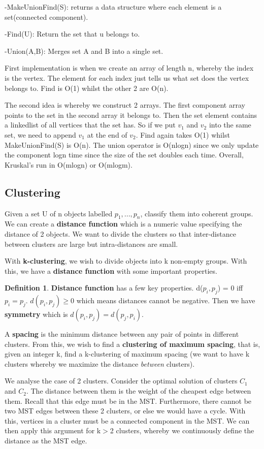 \documentclass[11pt, oneside]{article}
\theoremstyle{definition}
\newtheorem{definition}{Definition}[section]
\begin{document}
-MakeUnionFind(S): returns a data structure where each element is a set(connected component).

-Find(U): Return the set that u belongs to.

-Union(A,B): Merges set A and B into a single set.

First implementation is when we create an array of length n, whereby the index is the vertex. The element for each index just tells us what set does the vertex belongs to. Find is O(1) whilst the other 2 are O(n).

The second idea is whereby we construct 2 arrays. The first component array points to the set in the second array it belongs to. Then the set element contains a linkedlist of all vertices that the set has. So if we put $v_1$ and $v_2$ into the same set, we need to append $v_1$ at the end of $v_2$. Find again takes O(1) whilst MakeUnionFind(S) is O(n). The union operator is O(nlogn) since we only update the component logn time since the size of the set doubles each time. Overall, Kruskal's run in O(mlogn) or O(mlogm).

\subsection{Clustering}
Given a set U of n objects labelled $p_1,...,p_n$, classify them into coherent groups. We can create a \textbf{distance function} which is a numeric value specifying the distance of 2 objects. We want to divide the clusters so that inter-distance between clusters are large but intra-distances are small.

With \textbf{k-clustering}, we wish to divide objects into k non-empty groups. With this, we have a \textbf{distance function} with some important properties.

\begin{definition}
  \textbf{Distance function} has a few key properties. d($p_i,p_j$) = 0 iff $p_i = p_j$. $d(p_i,p_j)\geq 0$ which means distances cannot be negative. Then we have \textbf{symmetry} which is $d(p_i,p_j) = d(p_j,p_i)$.
\end{definition}

A \textbf{spacing} is the minimum distance between any pair of points in different clusters. From this, we wish to find a \textbf{clustering of maximum spacing}, that is, given an integer k, find a k-clustering of maximum spacing (we want to have k clusters whereby we maximize the distance \textit{between} clusters).

We analyse the case of 2 clusters. Consider the optimal solution of clusters $C_1$ and $C_2$. The distance between them is the weight of the cheapest edge between them. Recall that this edge must be in the MST. Furthermore, there cannot be two MST edges between these 2 clusters, or else we would have a cycle. With this, vertices in a cluster must be a connected component in the MST. We can then apply this argument for k$>$2 clusters, whereby we continuously define the distance as the MST edge.
\end{document}
